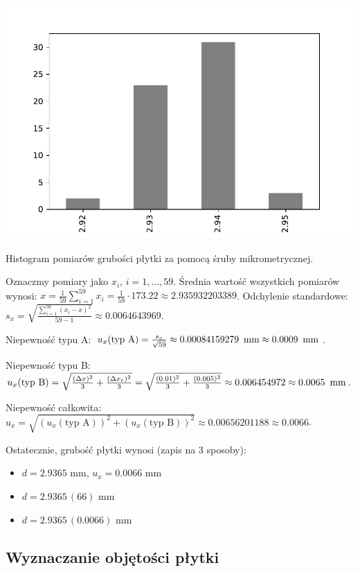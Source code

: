\documentclass[a4paper]{article}
\begin{document}
\begin{table}
\centering
\includegraphics[scale=0.7]{hist.pdf}
\caption{Histogram pomiarów grubości płytki za pomocą śruby mikrometrycznej.}
\end{table}

Oznaczmy pomiary jako $x_i$, $i = 1, \dots, 59$.
Średnia wartość wszystkich pomiarów wynosi: $x = \frac{1}{59} \sum_{i = 1}^{59} x_i = \frac{1}{59} \cdot 173.22 \approx 2.935932203389$.
Odchylenie standardowe: $s_x = \sqrt{\frac{\sum_{i=1}^{59} (x_i - x)^2}{59 - 1}} \approx 0.0064643969$.

Niepewność typu A: $u_x (\text{typ A}) = \frac{s_x}{\sqrt{59}} \approx 0.00084159279 \enskip \text{mm} \approx 0.0009 \enskip \text{mm}$.

Niepewność typu B: $u_x (\text{typ B}) = \sqrt{\frac{(\Delta x)^2}{3} + \frac{(\Delta x_e)^2}{3}} = \sqrt{\frac{(0.01)^2}{3} + \frac{(0.005)^2}{3}} \approx 0.006454972 \approx 0.0065 \enskip \text{mm}$.

Niepewność całkowita: $u_x = \sqrt{(u_x (\text{typ A}))^2 + (u_x (\text{typ B}))^2} \approx 0.00656201188 \approx 0.0066$.

Ostatecznie, grubość płytki wynosi (zapis na 3 sposoby):

\begin{itemize}
\item $d = 2.9365$ mm, $u_x = 0.0066$ mm
\item $d = 2.9365 \, (66)$ mm
\item $d = 2.9365 \, (0.0066)$ mm
\end{itemize}

\subsection{Wyznaczanie objętości płytki}
\end{document}
